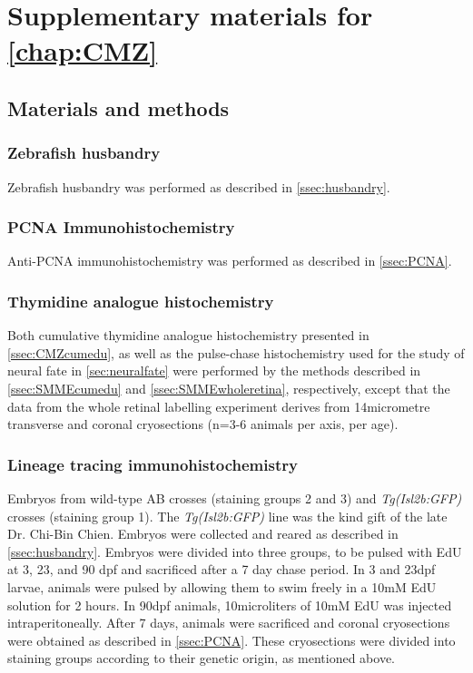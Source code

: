 \chapter{Supplementary materials for \autoref{chap:CMZ}}
\section{Materials and methods}
\subsection{Zebrafish husbandry}
Zebrafish husbandry was performed as described in \autoref{ssec:husbandry}.
\subsection{PCNA Immunohistochemistry}
Anti-PCNA immunohistochemistry was performed as described in \autoref{ssec:PCNA}.
\subsection{Thymidine analogue histochemistry}
\label{ssec:CMZEdU}
Both cumulative thymidine analogue histochemistry presented in \autoref{ssec:CMZcumedu}, as well as the pulse-chase histochemistry used for the study of neural fate in \autoref{sec:neuralfate} were performed by the methods described in \autoref{ssec:SMMEcumedu} and \autoref{ssec:SMMEwholeretina}, respectively, except that the data from the whole retinal labelling experiment derives from 14\si{micro}{metre} transverse and coronal cryosections (n=3-6 animals per axis, per age). 

\subsection{Lineage tracing immunohistochemistry}
\label{ssec:CMZlintrace}
Embryos from wild-type AB crosses (staining groups 2 and 3) and \textit{Tg(Isl2b:GFP)} crosses (staining group 1). The \textit{Tg(Isl2b:GFP)} line was the kind gift of the late Dr. Chi-Bin Chien. Embryos were collected and reared as described in \autoref{ssec:husbandry}. Embryos were divided into three groups, to be pulsed with EdU at 3, 23, and 90 dpf and sacrificed after a 7 day chase period. In 3 and 23dpf larvae, animals were pulsed by allowing them to swim freely in a 10mM EdU solution for 2 hours. In 90dpf animals, 10\si{micro}{liters} of 10mM EdU was injected intraperitoneally. After 7 days, animals were sacrificed and coronal cryosections were obtained as described in \autoref{ssec:PCNA}. These cryosections were divided into staining groups according to their genetic origin, as mentioned above.


